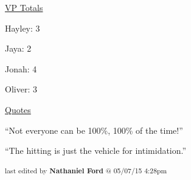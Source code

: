 \underline{  {\LARGE VP Totals }  }



Hayley: 3

Jaya: 2

Jonah: 4

Oliver: 3



\underline{  {\LARGE Quotes }  }





``Not everyone can be 100\%, 100\% of the time!''






``The hitting is just the vehicle for intimidation.''



\vspace{\fill}

\begin{flushright}
\textsubscript{last edited by \textbf{Nathaniel Ford} @ 05/07/15 4:28pm}
\end{flushright}

